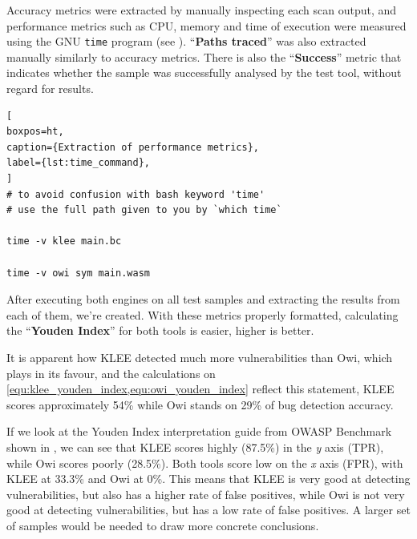 Accuracy metrics were extracted by manually inspecting each scan output, and performance metrics such as CPU, memory and time of execution were measured using the GNU \lstinline$time$ program (see ). ``\textbf{Paths traced}'' was also extracted manually similarly to accuracy metrics. There is also the ``\textbf{Success}'' metric that indicates whether the sample was successfully analysed by the test tool, without regard for results.

\begin{lstlisting}[
boxpos=ht,
caption={Extraction of performance metrics},
label={lst:time_command},
]
# to avoid confusion with bash keyword 'time'
# use the full path given to you by `which time`

time -v klee main.bc

time -v owi sym main.wasm   
\end{lstlisting}


After executing both engines on all test samples and extracting the results from each of them,  we're created. With these metrics properly formatted, calculating the ``\textbf{Youden Index}'' for both tools is easier, higher is better.

It is apparent how KLEE detected much more vulnerabilities than Owi, which plays in its favour, and the calculations on \cref{equ:klee_youden_index,equ:owi_youden_index} reflect this statement, KLEE scores approximately 54\% while Owi stands on 29\% of bug detection accuracy.

If we look at the Youden Index interpretation guide from OWASP Benchmark
 shown in , we can see that KLEE scores highly (87.5\%) in the \textit{y} axis (TPR), while Owi scores poorly (28.5\%). Both tools score low on the \textit{x} axis (FPR), with KLEE at 33.3\% and Owi at 0\%. This means that KLEE is very good at detecting vulnerabilities, but also has a higher rate of false positives, while Owi is not very good at detecting vulnerabilities, but has a low rate of false positives. A larger set of samples would be needed to draw more concrete conclusions.

